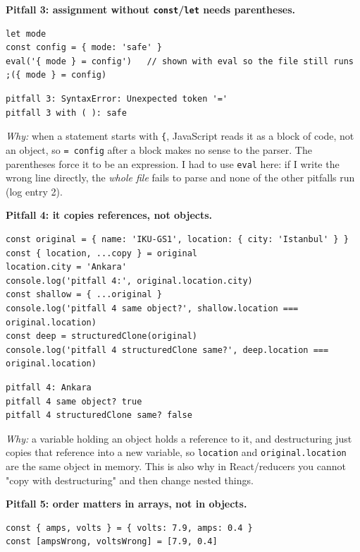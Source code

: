 \textbf{Pitfall 3: assignment without \passthrough{\lstinline!const!}/\passthrough{\lstinline!let!} needs parentheses.}

\begin{lstlisting}
let mode
const config = { mode: 'safe' }
eval('{ mode } = config')   // shown with eval so the file still runs
;({ mode } = config)
\end{lstlisting}

\begin{lstlisting}
pitfall 3: SyntaxError: Unexpected token '='
pitfall 3 with ( ): safe
\end{lstlisting}

\emph{Why:} when a statement starts with \passthrough{\lstinline!\{!}, JavaScript reads it as a block of code, not an object, so \passthrough{\lstinline!= config!} after a block makes no sense to the parser. The parentheses force it to be an expression. I had to use \passthrough{\lstinline!eval!} here: if I write the wrong line directly, the \emph{whole file} fails to parse and none of the other pitfalls run (log entry 2).

\textbf{Pitfall 4: it copies references, not objects.}

\begin{lstlisting}
const original = { name: 'IKU-GS1', location: { city: 'Istanbul' } }
const { location, ...copy } = original
location.city = 'Ankara'
console.log('pitfall 4:', original.location.city)
const shallow = { ...original }
console.log('pitfall 4 same object?', shallow.location === original.location)
const deep = structuredClone(original)
console.log('pitfall 4 structuredClone same?', deep.location === original.location)
\end{lstlisting}

\begin{lstlisting}
pitfall 4: Ankara
pitfall 4 same object? true
pitfall 4 structuredClone same? false
\end{lstlisting}

\emph{Why:} a variable holding an object holds a reference to it, and destructuring just copies that reference into a new variable, so \passthrough{\lstinline!location!} and \passthrough{\lstinline!original.location!} are the same object in memory. This is also why in React/reducers you cannot "copy with destructuring" and then change nested things.

\textbf{Pitfall 5: order matters in arrays, not in objects.}

\begin{lstlisting}
const { amps, volts } = { volts: 7.9, amps: 0.4 }
const [ampsWrong, voltsWrong] = [7.9, 0.4]
\end{lstlisting}

